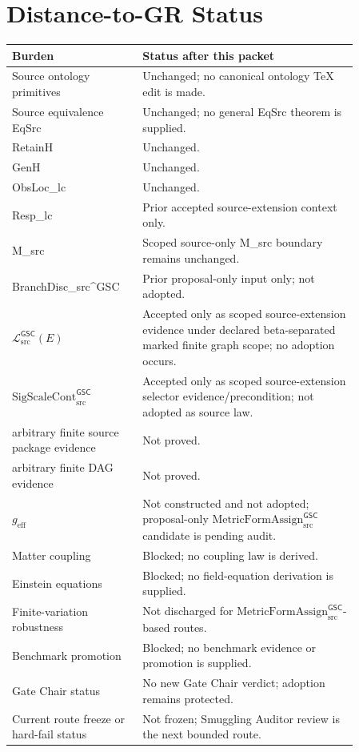 \documentclass[11pt]{article}
\newcommand{\MetricData}{\mathcal{L}_{\mathrm{src}}^{\mathsf{GSC}}}
\newcommand{\geff}{g_{\mathrm{eff}}}
\newcommand{\SigScaleCont}{\mathrm{SigScaleCont}_{\mathrm{src}}^{\mathsf{GSC}}}
\newcommand{\MetricFormAssign}{\mathrm{MetricFormAssign}_{\mathrm{src}}^{\mathsf{GSC}}}
\begin{document}
\section{Distance-to-GR Status}

\begin{longtable}{p{0.30\linewidth}p{0.56\linewidth}}
\toprule
Burden & Status after this packet \\
\midrule
Source ontology primitives & Unchanged; no canonical ontology TeX edit is made. \\
Source equivalence EqSrc & Unchanged; no general EqSrc theorem is supplied. \\
RetainH & Unchanged. \\
GenH & Unchanged. \\
ObsLoc\_lc & Unchanged. \\
Resp\_lc & Prior accepted source-extension context only. \\
M\_src & Scoped source-only M\_src boundary remains unchanged. \\
BranchDisc\_src\textasciicircum GSC & Prior proposal-only input only; not adopted. \\
\(\MetricData(E)\) & Accepted only as scoped source-extension evidence under
declared beta-separated marked finite graph scope; no adoption occurs. \\
\(\SigScaleCont\) & Accepted only as scoped source-extension selector
evidence/precondition; not adopted as source law. \\
arbitrary finite source package evidence & Not proved. \\
arbitrary finite DAG evidence & Not proved. \\
\(\geff\) & Not constructed and not adopted; proposal-only
\(\MetricFormAssign\) candidate is pending audit. \\
Matter coupling & Blocked; no coupling law is derived. \\
Einstein equations & Blocked; no field-equation derivation is supplied. \\
Finite-variation robustness & Not discharged for \(\MetricFormAssign\)-based routes. \\
Benchmark promotion & Blocked; no benchmark evidence or promotion is supplied. \\
Gate Chair status & No new Gate Chair verdict; adoption remains protected. \\
Current route freeze or hard-fail status & Not frozen; Smuggling Auditor review
is the next bounded route. \\
\bottomrule
\end{longtable}
\end{document}
